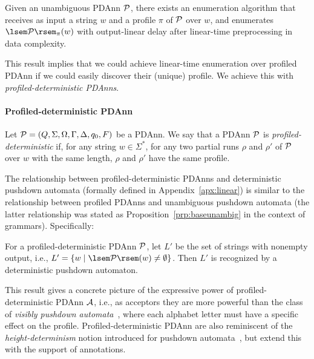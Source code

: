 %
%
%

\begin{lemma}\label{lem:vpaconv}
	Given an unambiguous PDAnn $\mathcal{P}$, there exists an enumeration algorithm
        that receives as input a string $w$ and a profile $\pi$ of $\mathcal{P}$ over
        $w$, and enumerates $\sem{\cP}_{\pi}(w)$ with output-linear delay after
        linear-time preprocessing in data complexity.
\end{lemma}

This result implies that we could achieve linear-time enumeration over profiled
PDAnn if we could easily discover their (unique) profile.
We achieve this with \emph{profiled-deterministic PDAnns}.

\paragraph{Profiled-deterministic PDAnn}
%
%
%
%
%
%
%
%
%
%
%
%
%
%
%
%
%
%
%
%
%
%
%
%
%
%
%
%
%
%
%
%
Let $\mathcal{P} = (Q, \Sigma, \Omega, \Gamma, \Delta, q_0, F)$ be a PDAnn. We
say that a PDAnn $\mathcal{P}$ is \emph{profiled-deterministic} if, for any
string $w \in \Sigma^*$, for any two partial runs $\rho$ and
$\rho'$ of $\mathcal{P}$ over $w$ with the same length, $\rho$ and $\rho'$ have the same profile.

The relationship between profiled-deterministic PDAnns and 
deterministic pushdown automata (formally defined in Appendix~\ref{apx:linear}) is similar to the relationship between 
profiled PDAnns and unambiguous pushdown automata (the latter relationship was
stated as
Proposition~\ref{prp:baseunambig} in the context of grammars). Specifically:

\begin{proposition}
  \label{prp:basedeterm}
  For a profiled-deterministic PDAnn $\mathcal{P}$, let $L'$ be the set of strings with nonempty output, i.e., $L' = \{w \mid \sem{\cP}(w) \not = \emptyset\} $. Then $L'$ is
  recognized by a deterministic pushdown automaton.
\end{proposition}

%
%
%
%

This result gives a concrete picture of the expressive power of 
profiled-deterministic PDAnn $\mathcal{A}$, i.e., as acceptors they are more powerful
than the class of
\emph{visibly pushdown
automata}~\cite{alur2004visibly}, where each alphabet letter must have a
specific effect on the profile. Profiled-deterministic PDAnn are also
reminiscent of 
%
%
%
%
%
%
%
%
%
%
%
%
%
%
%
%
the \emph{height-determinism} notion introduced for pushdown automata~\cite{nowotka2007height}, but
extend this with the support of annotations.
%

